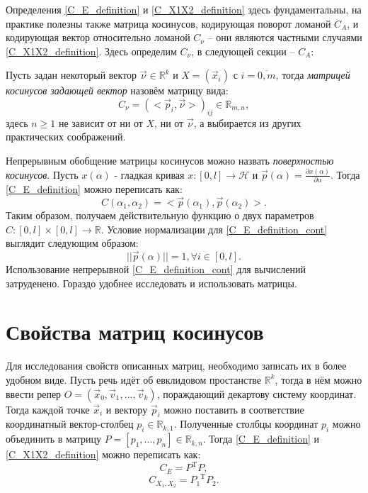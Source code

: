 Определения \ref{C_E_definition} и \ref{C_X1X2_definition} здесь фундаментальны, на практике полезны также матрица косинусов, кодирующая поворот ломаной $C_A$, и кодирующая вектор относительно ломаной ${C}_{\nu}$ -- они являются частными случаями \ref{C_X1X2_definition}. Здесь определим ${C}_{\nu}$, в следующей секции -- $C_A$:

Пусть задан некоторый вектор $\vec{\nu} \in \mathbb{R}^k$ и $X = (\vec{x}_{i})$ с $i = \overline{0,m}$, тогда \textit{матрицей косинусов задающей вектор} назовём матрицу вида:
\begin{equation}
	{C}_{\nu} = {(<\vec{p}_{i}, \vec{\nu}>)}_{ij} \in \mathbb{R}_{m,n},
	\label{C_nu_definition}
\end{equation}
здесь $n \ge 1$ не зависит от ни от $X$, ни от $\vec{\nu}$, а выбирается из других практических соображений.

Непрерывным обобщение матрицы косинусов можно назвать \textit{поверхностью косинусов}. Пусть $x(\alpha)$ - гладкая кривая $x : [0, l] \rightarrow \mathcal{H}$ и $\vec{p}(\alpha) = \frac{\partial{x(\alpha)}}{\partial{\alpha}}$. Тогда \ref{C_E_definition} можно переписать как:
\begin{equation}
	C({\alpha}_1, {\alpha}_2) = <\vec{p}(\alpha_1), \vec{p}(\alpha_2)>.
	\label{C_E_definition_cont}
\end{equation}
Таким образом, получаем действительную функцию о двух параметров $C : [0, l] \times [0, l] \rightarrow \mathbb{R}$.
Условие нормализации для \ref{C_E_definition_cont} выглядит следующим образом:
\begin{equation}
	||\vec{p}(\alpha)|| = 1, \forall{i} \in [0, l].
	\label{normalized_definition_cont}
\end{equation}
Использование непрерывной \ref{C_E_definition_cont} для вычислений затруденено. Гораздо удобнее исследовать и использовать матрицы.

\section{Свойства матриц косинусов}
Для исследования свойств описанных матриц, необходимо записать их в более удобном виде. Пусть речь идёт об евклидовом простанстве $\mathbb{R}^{k}$, тогда в нём можно ввести репер
$O = (\vec{x}_0, \vec{v}_1, ..., \vec{v}_k)$, пораждающий декартову систему координат. Тогда каждой точке $\vec{x}_i$ и вектору $\vec{p}_i$ можно поставить в соответствие координатный вектор-столбец $p_i \in \mathbb{R}_{k,1}$. Полученные столбцы координат $p_i$ можно объединить в матрицу $P = [p_1, ..., p_n] \in \mathbb{R}_{k,n}$. Тогда \ref{C_E_definition} и \ref{C_X1X2_definition} можно переписать как:
\begin{equation}
	C_E = P^\mathrm{T}P,
	\label{C_E_calc}
\end{equation}
\begin{equation}
	C_{X_1, X_2} = {P_1}^\mathrm{T}{P_2}.
	\label{C_X1X2_calc}
\end{equation}

